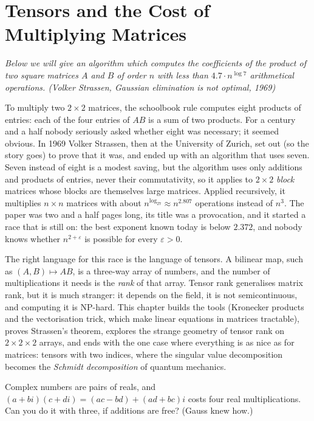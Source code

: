 \chapter{Tensors and the Cost of Multiplying Matrices}\label{linear:ch:tensors}

\begin{center}\itshape
Below we will give an algorithm which computes the coefficients of the product of two square matrices $A$ and $B$ of order $n$
with less than $4.7\cdot n^{\log7}$ arithmetical operations.
\upshape(Volker Strassen, \emph{Gaussian elimination is not optimal}, 1969)
\end{center}

To multiply two $2\times2$ matrices, the schoolbook rule computes eight products of entries: each of the four entries of $AB$ is
a sum of two products. For a century and a half nobody seriously asked whether eight was necessary; it seemed obvious. In 1969
Volker Strassen, then at the University of Zurich, set out (so the story goes) to prove that it was, and ended up with an
algorithm that uses seven. Seven instead of eight is a modest saving, but the algorithm uses only additions and
products of entries, never their commutativity, so it applies to $2\times2$ \emph{block} matrices whose blocks are themselves large
matrices. Applied recursively, it multiplies $n\times n$ matrices with about $n^{\log_27}\approx n^{2.807}$ operations instead of
$n^3$. The paper was two and a half pages long, its title was a provocation, and it started a race that is still on: the best
exponent known today is below $2.372$, and nobody knows whether $n^{2+\varepsilon}$ is possible for every $\varepsilon>0$.

The right language for this race is the language of tensors. A bilinear map, such as $(A,B)\mapsto AB$, is a three-way array of
numbers, and the number of multiplications it needs is the \emph{rank} of that array. Tensor rank generalises matrix rank, but it
is much stranger: it depends on the field, it is not semicontinuous, and computing it is NP-hard. This chapter builds the
tools (Kronecker products and the vectorisation trick, which make linear equations in matrices tractable), proves Strassen's
theorem, explores the strange geometry of tensor rank on $2\times2\times2$ arrays, and ends with the one case where everything
is as nice as for matrices: tensors with two indices, where the singular value decomposition becomes the \emph{Schmidt
decomposition} of quantum mechanics.

\begin{think}
Complex numbers are pairs of reals, and $(a+bi)(c+di)=(ac-bd)+(ad+bc)i$ costs four real multiplications. Can you do it with
three, if additions are free? (Gauss knew how.)
\end{think}

